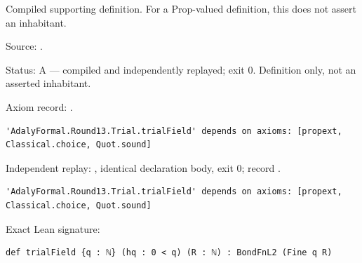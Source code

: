 \begin{definition}[bp-356]
\label{bp-356}
\leanok
Compiled supporting definition. For a Prop-valued definition, this does not assert an inhabitant.

\par Source: \texttt{}.
\par Status: A — compiled and independently replayed; exit 0. Definition only, not an asserted inhabitant.
\par Axiom record: \texttt{}.
\begin{verbatim}
'AdalyFormal.Round13.Trial.trialField' depends on axioms: [propext, Classical.choice, Quot.sound]
\end{verbatim}
\par Independent replay: \texttt{}, identical declaration body, exit 0; record \texttt{}.
\begin{verbatim}
'AdalyFormal.Round13.Trial.trialField' depends on axioms: [propext, Classical.choice, Quot.sound]
\end{verbatim}
\par Exact Lean signature:
\begin{verbatim}
def trialField {q : ℕ} (hq : 0 < q) (R : ℕ) : BondFnL2 (Fine q R)
\end{verbatim}
\end{definition}


